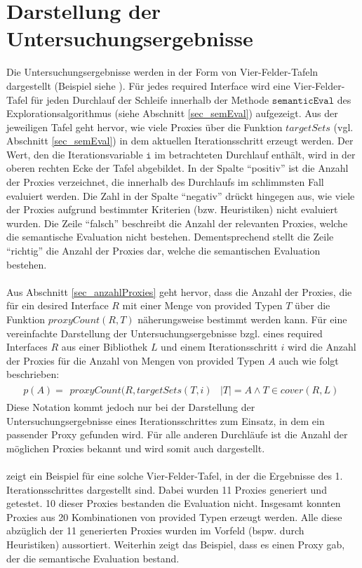 \section{Darstellung der Untersuchungsergebnisse}
Die Untersuchungsergebnisse werden in der Form von Vier-Felder-Tafeln dargestellt (Beispiel siehe ). Für jedes required Interface wird eine Vier-Felder-Tafel für jeden Durchlauf der Schleife innerhalb der Methode $\texttt{semanticEval}$ des Explorationsalgorithmus (siehe Abschnitt \ref{sec_semEval}) aufgezeigt. Aus der jeweiligen Tafel geht hervor, wie viele Proxies über die Funktion $\mathit{targetSets}$ (vgl. Abschnitt \ref{sec_semEval}) in dem aktuellen Iterationsschritt erzeugt werden. Der Wert, den die Iterationsvariable $\texttt{i}$ im betrachteten Durchlauf enthält, wird in der oberen rechten Ecke der Tafel abgebildet.
In der Spalte ``positiv'' ist die Anzahl der Proxies verzeichnet, die innerhalb des Durchlaufs im schlimmsten Fall evaluiert werden. Die Zahl in der Spalte ``negativ'' drückt hingegen aus, wie viele der Proxies aufgrund bestimmter Kriterien (bzw. Heuristiken) nicht evaluiert wurden.  Die Zeile ``falsch'' beschreibt die Anzahl der relevanten Proxies, welche die semantische Evaluation nicht bestehen. Dementsprechend stellt die Zeile ``richtig'' die Anzahl der Proxies dar, welche die semantischen Evaluation bestehen.
\\\\
Aus Abschnitt \ref{sec_anzahlProxies} geht hervor, dass die Anzahl der Proxies, die für ein desired Interface $R$ mit einer Menge von provided Typen $T$ über die Funktion $\mathit{proxyCount(R,T)}$ näherungsweise bestimmt werden kann. Für eine vereinfachte Darstellung der Untersuchungsergebnisse bzgl. eines required Interfaces $R$ aus einer Bibliothek $L$ und einem Iterationsschritt $i$ wird die Anzahl der Proxies für die Anzahl von Mengen von provided Typen $A$ auch wie folgt beschrieben:
\begin{gather*}
p(A) = \begin{array}{l|l}
\mathit{proxyCount(R,targetSets(T,i)} & |T| = A \wedge T \in \mathit{cover(R,L)}
\end{array}
\end{gather*}
\noindent
Diese Notation kommt jedoch nur bei der Darstellung der Untersuchungsergebnisse eines Iterationsschrittes zum Einsatz, in dem ein passender Proxy gefunden wird. Für alle anderen Durchläufe ist die Anzahl der möglichen Proxies bekannt und wird somit auch dargestellt. 
\\\\
 zeigt ein Beispiel für eine solche Vier-Felder-Tafel, in der die Ergebnisse des 1. Iterationsschrittes dargestellt sind. Dabei wurden 11 Proxies generiert und getestet. 10 dieser Proxies bestanden die Evaluation nicht. Insgesamt konnten Proxies aus 20 Kombinationen von provided Typen erzeugt werden. Alle diese abzüglich der 11 generierten Proxies wurden im Vorfeld (bspw. durch Heuristiken) aussortiert. Weiterhin zeigt das Beispiel, dass es einen Proxy gab, der die semantische Evaluation bestand.


